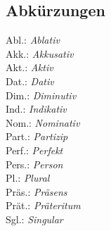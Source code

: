 \documentclass[a4paper]{book}
\begin{document}


\subsection{Abkürzungen}
\begin{multicols}{4}
  \noindent Abl.: \textit{Ablativ} \\
  Akk.: \textit{Akkusativ} \\
  Akt.: \textit{Aktiv} \\
  Dat.: \textit{Dativ} \\
  Dim.: \textit{Diminutiv} \\
  Ind.: \textit{Indikativ} \\
  Nom.: \textit{Nominativ} \\
  Part.: \textit{Partizip} \\
  Perf.: \textit{Perfekt} \\
  Pers.: \textit{Person} \\
  Pl.: \textit{Plural} \\
  Präs.: \textit{Präsens} \\
  Prät.: \textit{Präteritum} \\
  Sgl.: \textit{Singular} \\
\end{multicols} 
\end{document}
